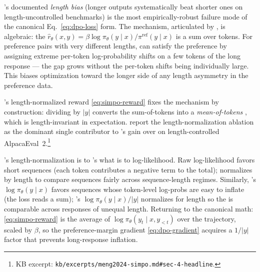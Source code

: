 's documented \emph{length bias} (longer outputs systematically beat
shorter ones on length-uncontrolled benchmarks) is the most
empirically-robust failure mode of the canonical Eq.~\cref{eq:dpo-loss}
form. The mechanism, articulated by \citet[\S 3]{meng2024-simpo}, is
algebraic: the 
$\hat r_\theta(x, y) = \beta \log \pi_\theta(y \mid x) /
\pi^{\mathrm{ref}}(y \mid x)$ is a sum over tokens. For preference pairs
with very different lengths,  can satisfy the preference by assigning
extreme per-token log-probability shifts on a few tokens of the long
response --- the  gap grows without the per-token
shifts being individually large. This biases optimization toward the
longer side of any length asymmetry in the preference data.

's length-normalized reward \cref{eq:simpo-reward} fixes the
mechanism by construction: dividing by $|y|$ converts the sum-of-tokens
 into a \emph{mean-of-tokens} , which is
length-invariant in expectation. \citet[\S 4.2]{meng2024-simpo} report
the length-normalization ablation as the dominant single contributor to
's gain over  on length-controlled
AlpacaEval~2.\footnote{KB excerpt:
\texttt{kb/excerpts/meng2024-simpo.md\#sec-4-headline}.}

\begin{intuition}
's length-normalization is to 's  what
 is to log-likelihood. Raw log-likelihood favors short
sequences (each token contributes a negative term to the total);
 normalizes by length to compare sequences fairly across
sequence-length regimes. Similarly, 's $\log \pi_\theta(y \mid x)$
favors sequences whose token-level log-probs are easy to inflate (the
loss reads a sum); 's $\log \pi_\theta(y \mid x) / |y|$ normalizes
for length so the  is comparable across responses of
unequal length. Returning to the canonical math:
\cref{eq:simpo-reward} is the average of $\log \pi_\theta(y_t \mid x,
y_{<t})$ over the trajectory, scaled by $\beta$, so the
preference-margin gradient \cref{eq:dpo-gradient} acquires a
$1 / |y|$ factor that prevents long-response inflation.
\end{intuition}

